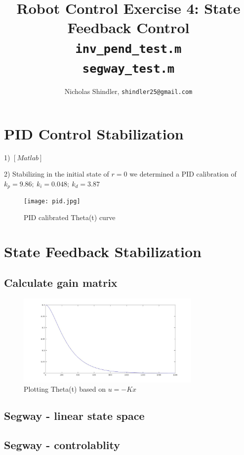 \documentclass{article}
\title{Robot Control Exercise 4: State Feedback Control\\
    \texttt{inv\_pend\_test.m}\\
    \texttt{segway\_test.m}}
\author{Nicholas Shindler, \texttt{shindler25@gmail.com}}
\begin{document}
\maketitle

\section{PID Control Stabilization}

1) $[Matlab]$

2) Stabilizing in the initial state of $r=0$ we determined a PID calibration of $k_p=9.86;\ k_i=0.048;\ k_d=3.87$

\begin{figure}[H]
    \centering
    \texttt{[image: pid.jpg]}
    \caption{PID calibrated Theta(t) curve}
    \label{fig:pid}
\end{figure}

\section{State Feedback Stabilization}
\subsection{Calculate gain matrix}


\begin{figure}[H]
    \centering
    \includegraphics[width=0.8\textwidth]{inv_pen_Ku.jpg}
    \caption{Plotting Theta(t) based on $u=-Kx$}
    \label{fig:eig_inv_pendulum}
\end{figure}


\subsection{Segway - linear state space}



\subsection{Segway - controlablity}
\end{document}
